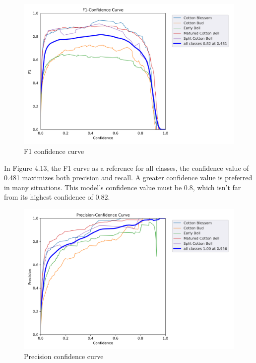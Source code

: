 \documentclass[12pt,a4paper]{report}
\begin{document}
\begin{enumerate}
\begin{figure}[!htb]
\begin{center}
\includegraphics[scale=0.6]{images/results/F1_curve.png}
\caption{F1 confidence curve}
\end{center}
\end{figure}

\par In Figure 4.13, the F1 curve as a reference for all classes, the confidence value of 0.481 maximizes both precision and recall. A greater confidence value is preferred in many situations. This model's confidence value must be 0.8, which isn't far from its highest confidence of 0.82.

\begin{figure}[!htb]
\begin{center}
\includegraphics[scale=0.6]{images/results/P_curve.png}
\caption{Precision confidence curve}
\end{center}
\end{figure}


\end{enumerate}
\end{document}
